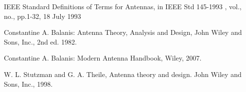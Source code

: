 \documentclass[12pt,letterpaper]{article}
\begin{document}
\newpage
\begin{thebibliography}{20}
    IEEE Standard Definitions of Terms for Antennas, in IEEE Std 145-1993 , vol., no., pp.1-32, 18 July 1993

    Constantine A. Balanis: Antenna Theory, Analysis and Design, John Wiley and Sons, Inc., 2nd ed. 1982.
    
    Constantine A. Balanis: Modern Antenna Handbook, Wiley, 2007.

    W. L. Stutzman and G. A. Theile, Antenna theory and design. John Wiley and Sons, Inc., 1998.
\end{thebibliography}
\end{document}
